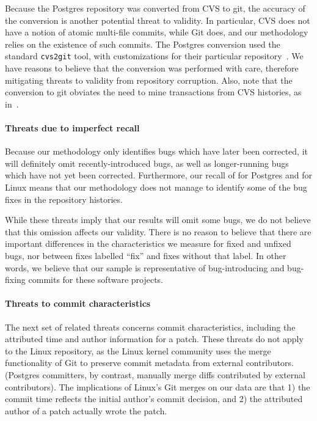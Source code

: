 Because the Postgres repository was converted from CVS to git, the
accuracy of the conversion is another potential threat to validity.  In
particular, CVS does not have a notion of atomic multi-file commits,
while Git does, and our methodology relies on the existence of such
commits. The Postgres conversion used the standard {\tt cvs2git} tool,
with customizations for their particular
repository~\cite{haas09:_so_why_postg_using_git}. We have reasons to
believe that the conversion was performed with care, therefore
mitigating threats to validity from repository corruption. 
Also, note that the conversion to git obviates the need to mine transactions
from CVS histories, as in~\cite{zimmermann-msr-2004}.

\paragraph{Threats due to imperfect recall}
Because our methodology only identifies bugs which have later been
corrected, it will definitely omit recently-introduced bugs, as well
as longer-running bugs which have not yet been corrected. Furthermore,
our recall of \postR for Postgres and \linuxR for Linux means
that our methodology does not manage to identify some of the bug fixes
in the repository histories.

While these threats imply that our results will omit some bugs, we do
not believe that this omission affects our validity. There is no
reason to believe that there are important differences in the
characteristics we measure for fixed and unfixed bugs, nor between
fixes labelled ``fix'' and fixes without that label. In other words,
we believe that our sample is representative of bug-introducing and
bug-fixing commits for these software projects.

\paragraph{Threats to commit characteristics}
The next set of related threats concerns commit characteristics,
including the attributed time and author information for a patch.
These threats do not apply to the Linux repository, as the Linux
kernel community uses the merge functionality of Git to preserve
commit metadata from external contributors. (Postgres committers, by
contrast, manually merge diffs contributed by external contributors).
The implications of Linux's Git merges on our data are that 1) the commit
time reflects the initial author's commit decision, and 2) the
attributed author of a patch actually wrote the patch.

